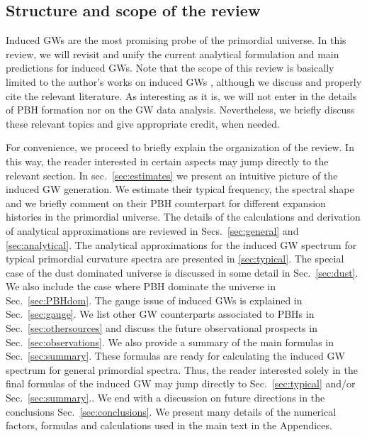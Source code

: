 \documentclass[a4paper,11pt]{article}
\numberwithin{equation}{section}
\begin{document}
\subsection{Structure and scope of the review\label{sec:structure}}

Induced GWs are the most promising probe of the primordial universe. In this review, we will revisit and unify the current analytical formulation and main predictions for induced GWs. Note that the scope of this review is basically limited to the author's works on induced GWs \cite{Domenech:2017ems,Domenech:2019quo,Domenech:2020kqm,Domenech:2020ssp,Domenech:2020ers,Domenech:2020xin,Atal:2021jyo,Domenech:2021wkk}, although we discuss and properly cite the relevant literature. As interesting as it is, we will not enter in the details of PBH formation nor on the GW data analysis. Nevertheless, we briefly discuss these relevant topics and give appropriate credit, when needed.

For convenience, we proceed to briefly explain the organization of the review. In this way, the reader interested in certain aspects may jump directly to the relevant section. In sec.~\ref{sec:estimates} we present an intuitive picture of the induced GW generation. We estimate their typical frequency, the spectral shape and we briefly comment on their PBH counterpart for different expansion histories in the primordial universe. The details of the calculations and derivation of analytical approximations are reviewed in Secs.~\ref{sec:general} and \ref{sec:analytical}. The analytical approximations for the induced GW spectrum for typical primordial curvature spectra are presented in \ref{sec:typical}. The special case of the dust dominated universe is discussed in some detail in Sec.~\ref{sec:dust}. We also include the case where PBH dominate the universe in Sec.~\ref{sec:PBHdom}. The gauge issue of induced GWs is explained in Sec.~\ref{sec:gauge}. We list other GW counterparts associated to PBHs in Sec.~\ref{sec:othersources} and discuss the future observational prospects in Sec.~\ref{sec:observations}. We also provide a summary of the main formulas in Sec.~\ref{sec:summary}. These formulas are ready for calculating the induced GW spectrum for general primordial spectra. Thus, the reader interested solely in the final formulas of the induced GW may jump directly to Sec.~\ref{sec:typical} and/or Sec.~\ref{sec:summary}.. We end with a discussion on future directions in the conclusions Sec.~\ref{sec:conclusions}. We present many details of the numerical factors, formulas and calculations used in the main text in the Appendices.
\end{document}
